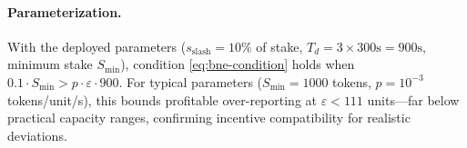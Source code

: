 \paragraph{Parameterization.}
With the deployed parameters ($s_{\text{slash}} = 10\%$ of stake,
$T_d = 3 \times 300\text{s} = 900\text{s}$, minimum stake $S_{\min}$),
condition \eqref{eq:bne-condition} holds when
$0.1 \cdot S_{\min} > p \cdot \varepsilon \cdot 900$. For typical parameters
($S_{\min} = 1000$ tokens, $p = 10^{-3}$ tokens/unit/s), this bounds profitable
over-reporting at $\varepsilon < 111$ units---far below practical capacity ranges,
confirming incentive compatibility for realistic deviations.

